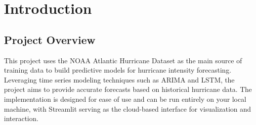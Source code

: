 %
%

\chapter{Introduction}

\section{Project Overview}
This project uses the NOAA Atlantic Hurricane Dataset as the main source of training data to build predictive models for hurricane intensity forecasting. Leveraging time series modeling techniques such as ARIMA and LSTM, the project aims to provide accurate forecasts based on historical hurricane data. The implementation is designed for ease of use and can be run entirely on your local machine, with Streamlit serving as the cloud-based interface for visualization and interaction. 


